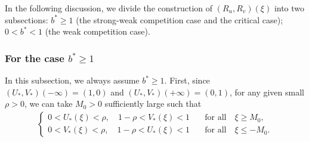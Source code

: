 \documentclass[11pt,a4paper]{article}
\numberwithin{equation}{section}
\numberwithin{figure}{section}
\newcommand\bea{\begin{eqnarray}}
\newcommand\eea{\end{eqnarray}}
\newcommand\beaa{\begin{eqnarray*}}
\newcommand\eeaa{\end{eqnarray*}}
\begin{document}




In the following discussion, we divide the construction of
$(R_u,R_v)(\xi)$ into two subsections: $b^*\ge 1$ (the strong-weak competition case and the critical case); $0<b^*<1$ (the weak competition case).


\subsubsection{For the case $b^*\ge 1$}\label{sec:3-1}

\noindent

In this subsection, we always assume $b^*\ge 1$.
First, since
$(U_*,V_*)(-\infty)=(1,0)$ and
$(U_*,V_*)(+\infty)=(0,1)$, for any given small $\rho>0$, we can take $M_0>0$ sufficiently large such that
\bea\label{rho}
\begin{cases}
0< U_*(\xi)<\rho,\quad 1-\rho<V_*(\xi)<1&\quad\mbox{for all}\quad\xi\geq M_0,\\
0< V_*(\xi)<\rho,\quad 1-\rho<U_*(\xi)<1&\quad\mbox{for all}\quad\xi\leq -M_0.
\end{cases}
\eea
\end{document}
